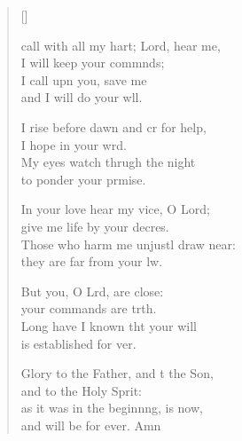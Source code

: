 \settowidth{\versewidth}{I call with all my heart; Lord, hear me, *}
\begin{verse}[\versewidth]
  \begin{patverse}
     call with all my hart; Lord, hear me,\Med\\
I will keep your commnds;\\
I call upn you, save me\Med\\
and I will do your w\pointup{\i}ll.

I rise before dawn and cr for help,\Med\\
I hope in your wrd.\\
My eyes watch thrugh the night\Med\\
to ponder your prmise.

In your love hear my vice, O Lord;\Med\\
give me life by your decres.\\
Those who harm me unjustl draw near:\Med\\
they are far from your lw.

But you, O Lrd, are close:\Med\\
your commands are trth.\\
Long have I known tht your will\Med\\
is established for ver.

Glory to the Father, and t the Son,\Med\\
and to the Holy Sp\pointup{\i}rit:\\
as it was in the beginn\pointup{\i}ng, is now,\Med\\
and will be for ever. Amn
  \end{patverse}
\end{verse}
